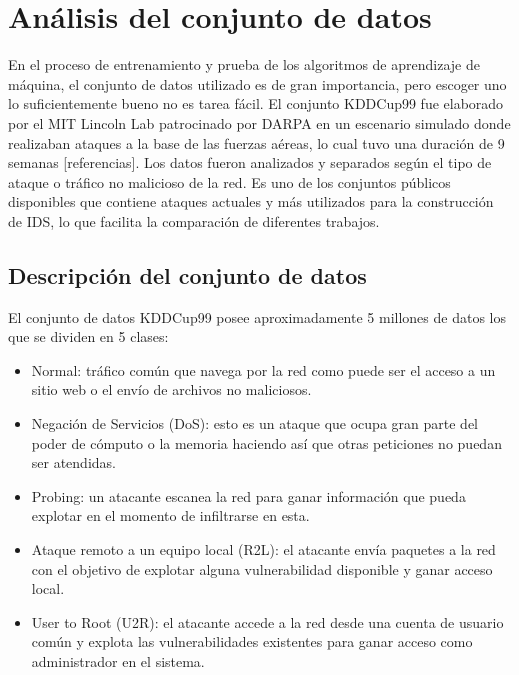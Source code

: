 \chapter{Análisis del conjunto de datos}\label{chapter:dataset}

En el proceso de entrenamiento y prueba de los algoritmos de aprendizaje de máquina, el conjunto de datos utilizado es de gran importancia, pero escoger uno lo suficientemente bueno no es tarea fácil. El conjunto KDDCup99 fue elaborado por el MIT Lincoln Lab patrocinado por DARPA en un escenario simulado donde realizaban ataques a la base de las fuerzas aéreas, lo cual tuvo una duración de 9 semanas [referencias]. Los datos fueron analizados y separados según el tipo de ataque o tráfico no malicioso de la red. Es uno de los conjuntos públicos disponibles que contiene ataques actuales y más utilizados para la construcción de IDS, lo que facilita la comparación de diferentes trabajos.

\section{Descripción del conjunto de datos}\label{section:dataset_description}
El conjunto de datos KDDCup99 posee aproximadamente 5 millones de datos los que se dividen en 5 clases:

\begin{itemize}
    \item Normal: tráfico común que navega por la red como puede ser el acceso a un sitio web o el envío de archivos no maliciosos.
    \item Negación de Servicios (DoS): esto es un ataque que ocupa gran parte del poder de cómputo o la memoria haciendo así que otras peticiones no puedan ser atendidas.
    \item Probing: un atacante escanea la red para ganar información que pueda explotar en el momento de infiltrarse en esta.
    \item Ataque remoto a un equipo local (R2L): el atacante envía paquetes a la red con el objetivo de explotar alguna vulnerabilidad disponible y ganar acceso local.
    \item User to Root (U2R): el atacante accede a la red desde una cuenta de usuario común y explota las vulnerabilidades existentes para ganar acceso como administrador en el sistema.
\end{itemize}

